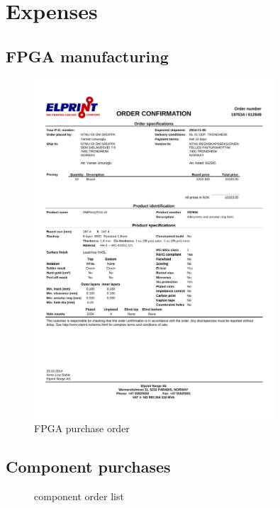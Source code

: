 \documentclass[../main/report.tex]{subfiles}
\begin{document}
\chapter{Expenses}

\section{FPGA manufacturing}

\begin{figure}[H]
	\centering
	\includegraphics[width=0.8\textwidth]{../appendix/assets/FPGA-purchase.pdf}
	\caption{FPGA purchase order}
	\label{fig: FPGA_order}
\end{figure}

\section{Component purchases}

\begin{figure}
	\centering
	
%	
	\caption{component order list}
	\label{fig: component_order}
\end{figure}

	\centering
%	
	
\end{document}
